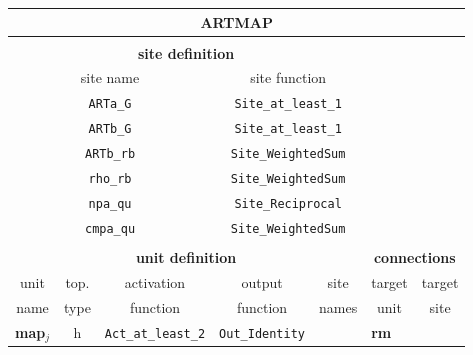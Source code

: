 {\newpage
\clearpage
\samepage \begin{tabular}{|l|c|l|l|l||l|l|}
\hline
%
\multicolumn{7}{|c|}{{\bf ARTMAP}} \\ 
\hline
\multicolumn{7}{l}{\vspace{5mm}} \\ 
\hline
%
\multicolumn{5}{|c||}{{\bf site definition}} & \multicolumn{2}{l|}{} \\ 
\cline{1-5}
%
\multicolumn{3}{|c|}{site name} & \multicolumn{2}{c||}{site function}
      & \multicolumn{2}{l|}{} \\ 
\cline{1-5}
%
\multicolumn{3}{|c|}{{\tt ARTa\_G}}
      & \multicolumn{2}{c||}{{\tt Site\_at\_least\_1}}
      & \multicolumn{2}{l|}{} \\ 
\cline{1-5}
%
\multicolumn{3}{|c|}{{\tt ARTb\_G}}
      & \multicolumn{2}{c||}{{\tt Site\_at\_least\_1}}
      & \multicolumn{2}{l|}{} \\ 
\cline{1-5}
%
\multicolumn{3}{|c|}{{\tt ARTb\_rb}}
      & \multicolumn{2}{c||}{{\tt Site\_WeightedSum}}
      & \multicolumn{2}{l|}{} \\ 
\cline{1-5}
%
\multicolumn{3}{|c|}{{\tt rho\_rb}}
      & \multicolumn{2}{c||}{{\tt Site\_WeightedSum}}
      & \multicolumn{2}{l|}{} \\ 
\cline{1-5}
%
\multicolumn{3}{|c|}{{\tt npa\_qu}}
      & \multicolumn{2}{c||}{{\tt Site\_Reciprocal}}
      & \multicolumn{2}{l|}{} \\ 
\cline{1-5}
%
\multicolumn{3}{|c|}{{\tt cmpa\_qu}}
      & \multicolumn{2}{c||}{{\tt Site\_WeightedSum}}
      & \multicolumn{2}{l|}{} \\ 
\cline{1-7}
%
\hline
\multicolumn{7}{l}{\vspace{5mm}} \\ 
\hline
%
\multicolumn{5}{|c||}{{\bf unit definition}}
       & \multicolumn{2}{c|}{{\bf connections}} \\ 
\hline
%
\multicolumn{1}{|c}{unit} & \multicolumn{1}{|c}{top.} &
\multicolumn{1}{|c}{activation} & \multicolumn{1}{|c}{output} &
\multicolumn{1}{|c||}{site} & \multicolumn{1}{c}{target} &
\multicolumn{1}{|c|}{target} \\ 
%
\multicolumn{1}{|c}{name} & \multicolumn{1}{|c}{type} &
\multicolumn{1}{|c|}{function} & \multicolumn{1}{|c}{function}
& \multicolumn{1}{|c||}{names} & \multicolumn{1}{c}{unit} &
\multicolumn{1}{|c|}{site} \\ 
\hline
%
{\bf map}$_{j}$ & h & {\tt Act\_at\_least\_2} & {\tt Out\_Identity}  & & {\bf rm} & \\ 

\end{tabular}}
